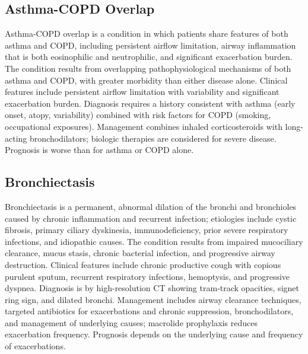 \subsection{Asthma-COPD Overlap}
\label{sec:Asthma-COPD Overlap}
Asthma-COPD overlap is a condition in which patients share features of both asthma and COPD, including persistent airflow limitation, airway inflammation that is both eosinophilic and neutrophilic, and significant exacerbation burden. The condition results from overlapping pathophysiological mechanisms of both asthma and COPD, with greater morbidity than either disease alone. Clinical features include persistent airflow limitation with variability and significant exacerbation burden. Diagnosis requires a history consistent with asthma (early onset, atopy, variability) combined with risk factors for COPD (smoking, occupational exposures). Management combines inhaled corticosteroids with long-acting bronchodilators; biologic therapies are considered for severe disease. Prognosis is worse than for asthma or COPD alone.

\subsection{Bronchiectasis}
\label{sec:Bronchiectasis}
Bronchiectasis is a permanent, abnormal dilation of the bronchi and bronchioles caused by chronic inflammation and recurrent infection; etiologies include cystic fibrosis, primary ciliary dyskinesia, immunodeficiency, prior severe respiratory infections, and idiopathic causes. The condition results from impaired mucociliary clearance, mucus stasis, chronic bacterial infection, and progressive airway destruction. Clinical features include chronic productive cough with copious purulent sputum, recurrent respiratory infections, hemoptysis, and progressive dyspnea. Diagnosis is by high-resolution CT showing tram-track opacities, signet ring sign, and dilated bronchi. Management includes airway clearance techniques, targeted antibiotics for exacerbations and chronic suppression, bronchodilators, and management of underlying causes; macrolide prophylaxis reduces exacerbation frequency. Prognosis depends on the underlying cause and frequency of exacerbations.

